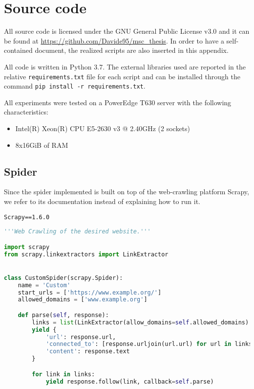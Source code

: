 \chapter{Source code}
All source code is licensed under the GNU General Public License v3.0 and it can be found at \url{https://github.com/Davide95/msc_thesis}.
In order to have a self-contained document, the realized scripts are also inserted in this appendix.

All code is written in Python 3.7. The external libraries used are reported in the relative \texttt{requirements.txt} file for each script and can be installed through the command \texttt{pip install -r requirements.txt}.

All experiments were tested on a PowerEdge T630 server with the following characteristics:
\begin{itemize}[topsep=0pt]
    \item Intel(R) Xeon(R) CPU E5-2630 v3 @ 2.40GHz (2 sockets)
    \item 8x16GiB of RAM
\end{itemize}

\section{Spider} \label{spider}

Since the spider implemented is built on top of the web-crawling platform Scrapy, we refer to its documentation instead of explaining how to run it.

\begin{lstlisting}[caption=requirements.txt]
Scrapy==1.6.0
\end{lstlisting}

\begin{lstlisting}[language=Python, caption=custom\_spider.py]
'''Web Crawling of the desired website.'''

import scrapy
from scrapy.linkextractors import LinkExtractor


class CustomSpider(scrapy.Spider):
    name = 'Custom'
    start_urls = ['https://www.example.org/']
    allowed_domains = ['www.example.org']

    def parse(self, response):
        links = list(LinkExtractor(allow_domains=self.allowed_domains).extract_links(response))
        yield {
            'url': response.url,
            'connected_to': [response.urljoin(url.url) for url in links],
            'content': response.text
        }

        for link in links:
            yield response.follow(link, callback=self.parse)
\end{lstlisting}